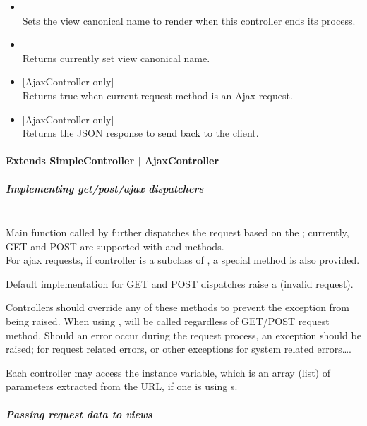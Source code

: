 \documentclass[pdftex,12pt,a4paper]{article}
\begin{document}
\begin{itemize}
	\item {} \hfill \\
	Sets the view canonical name to render when this controller ends its process.
	\item {} \hfill \\
	Returns currently set view canonical name.
	\item {} [AjaxController only] \hfill \\
	Returns true when current request method is an Ajax request.
	\item {} [AjaxController only] \hfill \\
	Returns the JSON response to send back to the client.
\end{itemize}

\paragraph{Extends SimpleController $|$ AjaxController}

\subparagraph{Implementing get/post/ajax dispatchers}\hfill\\

Main function  called by  further dispatches the request based on the
; currently, GET and POST are supported with  and  methods.\\
For ajax requests, if controller is a subclass of , a special  method is also provided.
\begin{note}
Default implementation for GET and POST dispatches raise a  (invalid request).
\end{note}
Controllers should override any of these methods to prevent the exception from being raised. When using ,  will be called regardless of GET/POST request method.
Should an error occur during the request process, an exception should be raised;  for request related errors, or other exceptions for system related errors\ldots.

Each controller may access the  instance variable, which is an array (list) of parameters extracted from the URL, if one is using s.

\subparagraph{Passing request data to views}
\end{document}
